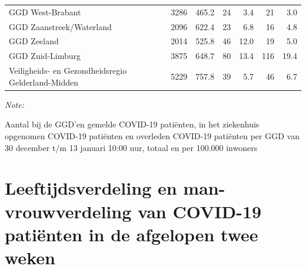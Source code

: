 \documentclass[
  english,
  man,floatsintext]{apa6}
\begin{document}
\begin{table}[H]
\begin{threeparttable}
\begin{tabular}{lrrrrrr}
GGD West-Brabant & 3286 & 465.2 & 24 & 3.4 & 21 & 3.0\\
GGD Zaanstreek/Waterland & 2096 & 622.4 & 23 & 6.8 & 16 & 4.8\\
GGD Zeeland & 2014 & 525.8 & 46 & 12.0 & 19 & 5.0\\
GGD Zuid-Limburg & 3875 & 648.7 & 80 & 13.4 & 116 & 19.4\\
Veiligheids- en Gezondheidsregio Gelderland-Midden & 5229 & 757.8 & 39 & 5.7 & 46 & 6.7\\
\bottomrule
\end{tabular}
\begin{tablenotes}
\item \textit{Note: } 
\item Aantal bij de GGD’en gemelde COVID-19 patiënten, in het ziekenhuis opgenomen COVID-19 patiënten en overleden COVID-19 patiënten per GGD van 30 december t/m 13 januari 10:00 uur, totaal en per 100.000 inwoners
\end{tablenotes}
\end{threeparttable}
\endgroup{}
\end{table}

\newpage

\hypertarget{leeftijdsverdeling-en-man-vrouwverdeling-van-covid-19-patiuxebnten-in-de-afgelopen-twee-weken}{%
\section{Leeftijdsverdeling en man-vrouwverdeling van COVID-19 patiënten in de afgelopen twee weken}\label{leeftijdsverdeling-en-man-vrouwverdeling-van-covid-19-patiuxebnten-in-de-afgelopen-twee-weken}}
\end{document}
